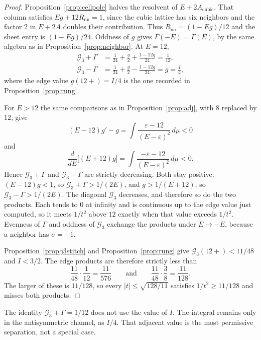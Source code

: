 \begin{proof}
Proposition~\ref{prop:cellpole} halves the resolvent of
\(E+2A_{\mathrm{cubic}}\).
That column satisfies \(Eg+12 R_{\mathrm{nn}}=1\), since the cubic lattice
has six neighbors and the factor \(2\) in \(E+2A\) doubles their contribution.
Thus \(R_{\mathrm{nn}}=(1-Eg)/12\) and the sheet entry is \((1-Eg)/24\).
Oddness of \(g\) gives \(\Gamma(-E)=\Gamma(E)\), by the same algebra as in
Proposition~\ref{prop:neighbor}.
At \(E=12\),
\begin{align*}
\mathcal{G}_3+\Gamma
&=\frac{1}{24}+\frac g2+\frac{1-12g}{24}
=\frac{1}{12},\\
\mathcal{G}_3-\Gamma
&=\frac{1}{24}+\frac g2-\frac{1-12g}{24}
=g=\frac I4,
\end{align*}
where the edge value \(g(12+)=I/4\) is the one recorded in
Proposition~\ref{prop:rung}.

For \(E>12\) the same comparisons as in Proposition~\ref{prop:adj}, with
\(8\) replaced by \(12\), give
\[
(E-12)g'-g
=\int\frac{\varepsilon-12}{(E-\varepsilon)^2}\,d\mu<0
\]
and
\[
\frac{d}{dE}\bigl[(E+12)g\bigr]
=\int\frac{-\varepsilon-12}{(E-\varepsilon)^2}\,d\mu<0.
\]
Hence \(\mathcal{G}_3+\Gamma\) and \(\mathcal{G}_3-\Gamma\) are strictly
decreasing.
Both stay positive: \((E-12)g<1\), so
\(\mathcal{G}_3+\Gamma>1/(2E)\), and \(g>1/(E+12)\), so
\(\mathcal{G}_3-\Gamma>1/(2E)\).
The diagonal \(\mathcal{G}_3\) decreases, and therefore so do the two
products.
Each tends to \(0\) at infinity and is continuous up to the edge value just
computed, so it meets \(1/t^2\) above \(12\) exactly when that value exceeds
\(1/t^2\).
Evenness of \(\Gamma\) and oddness of \(\mathcal{G}_3\) exchange the products
under \(E\mapsto -E\), because a neighbor has \(\sigma=-1\).

Proposition~\ref{prop:j3stitch} and Proposition~\ref{prop:rung} give
\(\mathcal{G}_3(12+)<11/48\) and \(I<3/2\).
The edge products are therefore strictly less than
\[
\frac{11}{48}\cdot\frac{1}{12}=\frac{11}{576}
\qquad\text{and}\qquad
\frac{11}{48}\cdot\frac{3}{8}=\frac{11}{128}.
\]
The larger of these is \(11/128\), so every
\(|t|\le\sqrt{128/11}\) satisfies \(1/t^2\ge 11/128\) and misses both
products.
\end{proof}

The identity \(\mathcal{G}_3+\Gamma=1/12\) does not use the value of \(I\).
The integral remains only in the antisymmetric channel, as \(I/4\).
That adjacent value is the most permissive separation, not a special case.

